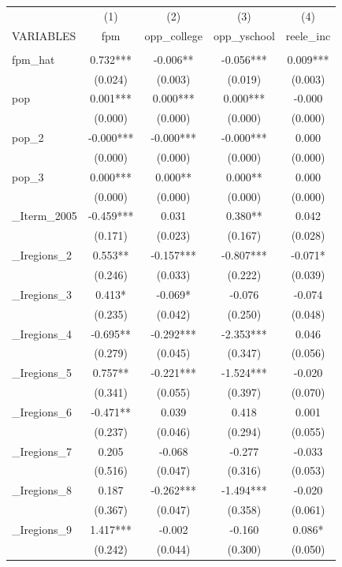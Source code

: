 \documentclass[]{article}
\begin{document}
\begin{tabular}{lcccc} \hline
 & (1) & (2) & (3) & (4) \\
VARIABLES & fpm & opp\_college & opp\_yschool & reele\_inc \\ \hline
 &  &  &  &  \\
fpm\_hat & 0.732*** & -0.006** & -0.056*** & 0.009*** \\
 & (0.024) & (0.003) & (0.019) & (0.003) \\
pop & 0.001*** & 0.000*** & 0.000*** & -0.000 \\
 & (0.000) & (0.000) & (0.000) & (0.000) \\
pop\_2 & -0.000*** & -0.000*** & -0.000*** & 0.000 \\
 & (0.000) & (0.000) & (0.000) & (0.000) \\
pop\_3 & 0.000*** & 0.000** & 0.000** & 0.000 \\
 & (0.000) & (0.000) & (0.000) & (0.000) \\
\_Iterm\_2005 & -0.459*** & 0.031 & 0.380** & 0.042 \\
 & (0.171) & (0.023) & (0.167) & (0.028) \\
\_Iregions\_2 & 0.553** & -0.157*** & -0.807*** & -0.071* \\
 & (0.246) & (0.033) & (0.222) & (0.039) \\
\_Iregions\_3 & 0.413* & -0.069* & -0.076 & -0.074 \\
 & (0.235) & (0.042) & (0.250) & (0.048) \\
\_Iregions\_4 & -0.695** & -0.292*** & -2.353*** & 0.046 \\
 & (0.279) & (0.045) & (0.347) & (0.056) \\
\_Iregions\_5 & 0.757** & -0.221*** & -1.524*** & -0.020 \\
 & (0.341) & (0.055) & (0.397) & (0.070) \\
\_Iregions\_6 & -0.471** & 0.039 & 0.418 & 0.001 \\
 & (0.237) & (0.046) & (0.294) & (0.055) \\
\_Iregions\_7 & 0.205 & -0.068 & -0.277 & -0.033 \\
 & (0.516) & (0.047) & (0.316) & (0.053) \\
\_Iregions\_8 & 0.187 & -0.262*** & -1.494*** & -0.020 \\
 & (0.367) & (0.047) & (0.358) & (0.061) \\
\_Iregions\_9 & 1.417*** & -0.002 & -0.160 & 0.086* \\
 & (0.242) & (0.044) & (0.300) & (0.050) \\

\end{tabular}
\end{document}

